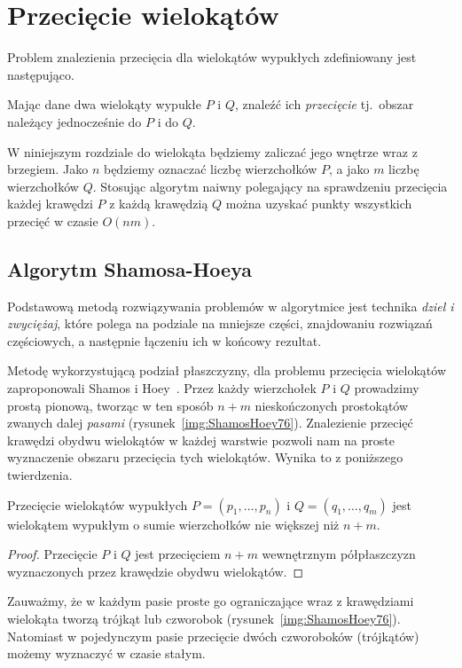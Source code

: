\chapter{Przecięcie wielokątów}
Problem znalezienia przecięcia dla wielokątów wypukłych zdefiniowany
jest następująco.

\begin{problem}
  Mając dane dwa wielokąty wypukłe $P$ i $Q$, znaleźć ich
  \emph{przecięcie} tj.\ obszar należący jednocześnie do $P$ i do $Q$.
\end{problem}

W niniejszym rozdziale do wielokąta będziemy zaliczać jego wnętrze
wraz z brzegiem. Jako $n$ będziemy oznaczać liczbę wierzchołków $P$, a
jako $m$ liczbę wierzchołków $Q$. Stosując algorytm naiwny polegający
na sprawdzeniu przecięcia każdej krawędzi $P$ z każdą krawędzią $Q$
można uzyskać punkty wszystkich przecięć w czasie $O(nm)$.

\section{Algorytm Shamosa-Hoeya}
Podstawową metodą rozwiązywania problemów w algorytmice jest technika
\emph{dziel i zwyciężaj}, które polega na podziale na mniejsze części,
znajdowaniu rozwiązań częściowych, a następnie łączeniu ich w końcowy
rezultat.

Metodę wykorzystującą podział płaszczyzny, dla problemu przecięcia
wielokątów zaproponowali Shamos i Hoey~\cite{ShamosHoey76}. Przez
każdy wierzchołek $P$ i $Q$ prowadzimy prostą pionową, tworząc w ten
sposób $n+m$ nieskończonych prostokątów zwanych dalej \emph{pasami}
(rysunek~\ref{img:ShamosHoey76}). Znalezienie przecięć krawędzi obydwu
wielokątów w każdej warstwie pozwoli nam na proste wyznaczenie obszaru
przecięcia tych wielokątów. Wynika to z poniższego twierdzenia.

\begin{twierdzenie}
  Przecięcie wielokątów wypukłych $P = (p_1, \ldots, p_n)$ i $Q =
  (q_1, \ldots, q_m)$ jest wielokątem wypukłym o sumie wierzchołków
  nie większej niż $n + m$.
\end{twierdzenie}

\begin{proof}
  Przecięcie $P$ i $Q$ jest przecięciem $n + m$ wewnętrznym
  półpłaszczyzn wyznaczonych przez krawędzie obydwu wielokątów.
\end{proof}

Zauważmy, że w każdym pasie proste go ograniczające wraz z krawędziami
wielokąta tworzą trójkąt lub czworobok
(rysunek~\ref{img:ShamosHoey76}). Natomiast w pojedynczym pasie
przecięcie dwóch czworoboków (trójkątów) możemy wyznaczyć w czasie
stałym.

